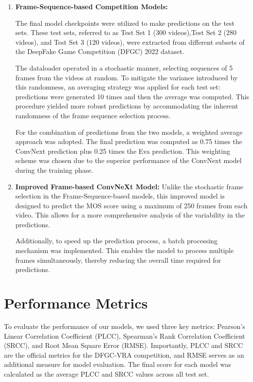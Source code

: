 \documentclass[a4paper,12pt,openright]{book}
\begin{document}
\begin{enumerate}
    \item \textbf{Frame-Sequence-based Competition Models:} 

The final model checkpoints were utilized to make predictions on the test sets. These test sets, referred to as Test Set 1 (300 videos),Test Set 2 (280 videos), and Test Set 3 (120 videos), were extracted from different subsets of the DeepFake Game Competition (DFGC) 2022 dataset.

The dataloader operated in a stochastic manner, selecting sequences of 5 frames from the videos at random. To mitigate the variance introduced by this randomness, an averaging strategy was applied for each test set: predictions were generated 10 times and then the average was computed. This procedure yielded more robust predictions by accommodating the inherent randomness of the frame sequence selection process.

For the combination of predictions from the two models, a weighted average approach was adopted. The final prediction was computed as 0.75 times the ConvNext prediction plus 0.25 times the Eva prediction. This weighting scheme was chosen due to the superior performance of the ConvNext model during the training phase.

\item \textbf{Improved Frame-based ConvNeXt Model:}
Unlike the stochastic frame selection in the Frame-Sequence-based models, this improved model is designed to predict the MOS score using a maximum of 250 frames from each video. This allows for a more comprehensive analysis of the variability in the predictions. 

Additionally, to speed up the prediction process, a batch processing mechanism was implemented. This enables the model to process multiple frames simultaneously, thereby reducing the overall time required for predictions. 
\end{enumerate}

\section{Performance Metrics}
To evaluate the performance of our models, we used three key metrics: Pearson's Linear Correlation Coefficient (PLCC), Spearman's Rank Correlation Coefficient (SRCC), and Root Mean Square Error (RMSE). Importantly, PLCC and SRCC are the official metrics for the DFGC-VRA competition, and RMSE serves as an additional measure for model evaluation.
The final score for each model was calculated as the average PLCC and SRCC values across all test set.
\end{document}
